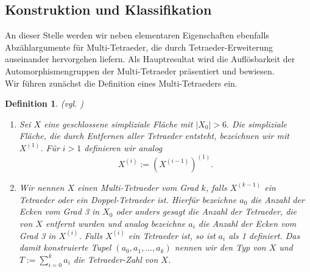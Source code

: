 \documentclass[12pt,titlepage,twoside,cleardoublepage]{article}
\theoremstyle{nummermitklammern}
\newtheorem{definition}[temp]{Definition}
\newtheorem{definition}[zahl]{Definition}
\numberwithin{equation}{section}
\begin{document}
\subsection{Konstruktion und Klassifikation}\label{cactus}
An dieser Stelle werden wir neben elementaren Eigenschaften ebenfalls Abzählargumente für Multi-Tetraeder, die durch Tetraeder-Erweiterung auseinander hervorgehen liefern. Als Hauptresultat wird die Auflösbarkeit der Automorphismengruppen der Multi-Tetraeder präsentiert und bewiesen.\\
Wir führen zunächst die Definition eines Multi-Tetraeders ein.
\begin{definition}{\textsc{(}vgl. \textsc{\cite{simp})}}\label{defcac}
\begin{enumerate}
\item Sei $X$ eine geschlossene simpliziale Fläche mit $\vert X_0\vert > 6.$
 Die simpliziale Fläche, die durch Entfernen aller Tetraeder entsteht, bezeichnen wir mit $X^{(1)}$. Für $i>1$ definieren wir analog 
\[
X^{(i)}:=(X^{(i-1)})^{(1)}.
\]
\item Wir nennen $X$ einen \emph{Multi-Tetraeder vom Grad} $k$, falls $X^{(k-1)}$ ein Tetraeder oder ein Doppel-Tetraeder ist. Hierfür bezeichne $a_0$ die Anzahl der Ecken vom Grad 3 in $X_0$ oder anders gesagt die Anzahl der Tetraeder, die von $X$ entfernt wurden und analog bezeichne $a_i$ die Anzahl der Ecken vom Grad 3 in $X^{(i)}$. Falls $X^{(i)}$ ein Tetraeder ist, so ist $a_i$ als 1 definiert. Das damit konstruierte Tupel $(a_0,a_1,\ldots,a_k)$ nennen wir den \emph{Typ} von $X$ und $T:=\sum_{i=0}^{k} a_i$ die \emph{Tetraeder-Zahl} von $X$.\\
\end{enumerate}
\end{definition}
\end{document}
